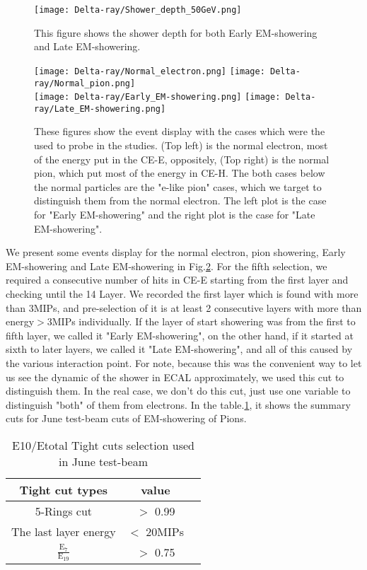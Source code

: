 \documentclass[12pt,twoside,a4paper,an,final]{cms-tdr}
\begin{document}
\begin{figure}[!htb]
\centering 
     \texttt{[image: Delta-ray/Shower\_depth\_50GeV.png]}
\caption{This figure shows the shower depth for both Early EM-showering and Late EM-showering.}
\label{HGCAL_shower_depth}
\end{figure}

\begin{figure}[!htb]
\centering
     \texttt{[image: Delta-ray/Normal\_electron.png]}
     \texttt{[image: Delta-ray/Normal\_pion.png]}\\
     \texttt{[image: Delta-ray/Early\_EM-showering.png]}
     \texttt{[image: Delta-ray/Late\_EM-showering.png]}
\caption{These figures show the event display with the cases which were the used to probe in the studies. (Top left) is the normal electron, most of the energy put in the CE-E, oppositely, (Top right) is the normal pion, which put most of the energy in CE-H. The both cases below the normal particles are the "e-like pion" cases, which we target to distinguish them from the normal electron. The left plot is the case for "Early EM-showering" and the right plot is the case for "Late  EM-showering".}
\label{Event_display}
\end{figure}

We present some events display for the normal electron, pion showering, Early EM-showering and Late EM-showering in Fig.\ref{Event_display}. For the fifth selection, we required a consecutive number of hits in CE-E starting from the first layer and checking until the 14 Layer. We recorded the first layer which is found with more than 3MIPs, and pre-selection of it is at least 2 consecutive layers with more than energy$>$3MIPs individually. If the layer of start showering was from the first to fifth layer, we called it "Early EM-showering", on the other hand, if it started at sixth to later layers, we called it "Late EM-showering", and all of this caused by the various interaction point. For note, because this was the convenient way to let us see the dynamic of the shower in ECAL approximately, we used this cut to distinguish them. In the real case, we don't do this cut, just use one variable to distinguish "both" of them from electrons. In the table.\ref{basic_1}, it shows the summary cuts for June test-beam cuts of EM-showering of Pions.

\begin{table}[h]%
    \centering
    \begin{tabular}{|c|c|c|}
    \hline
    Tight cut types & value\\\hline
    5-Rings cut &  $>$ 0.99 \\\hline  
    The last layer energy & $<$ 20MIPs \\\hline  
   $\mathrm{\frac{E_{7}}{E_{19}}}$& $>$ 0.75\\\hline  
        \end{tabular}
    \caption{E10/Etotal Tight cuts selection used in June test-beam}\label{basic_1}  %
\end{table}
\end{document}
